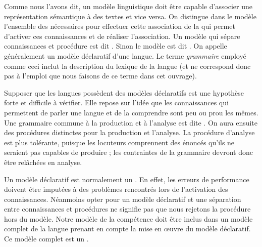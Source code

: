 Comme nous l’avons dit, un modèle linguistique doit être capable d’associer une représentation sémantique à des textes et vice versa. On distingue dans le modèle l’ensemble des  nécessaires pour effectuer cette association de la  qui permet d’activer ces connaissances et de réaliser l’association. Un modèle qui sépare connaissances et procédure est dit . Sinon le modèle est dit . On appelle généralement  un modèle déclaratif d’une langue. Le terme \textit{grammaire} employé comme ceci inclut la description du lexique de la langue (et ne correspond donc pas à l'emploi que nous faisons de ce terme dans cet ouvrage).

Supposer que les langues possèdent des modèles déclaratifs est une hypothèse forte et difficile à vérifier. Elle repose sur l’idée que les connaissances qui permettent de parler une langue et de la comprendre sont peu ou prou les mêmes. Une grammaire commune à la production et à l’analyse est dite . On aura ensuite des procédures distinctes pour la production et l’analyse. La procédure d’analyse est plus tolérante, puisque les locuteurs comprennent des énoncés qu’ils ne seraient pas capables de produire ; les contraintes de la grammaire devront donc être relâchées en analyse.

Un modèle déclaratif est normalement un . En effet, les erreurs de performance doivent être imputées à des problèmes rencontrés lors de l’activation des connaissances. Néanmoins opter pour un modèle déclaratif et une séparation entre connaissances et procédures ne signifie pas que nous rejetons la procédure hors du modèle. Notre modèle de la compétence doit être inclus dans un modèle complet de la langue prenant en compte la mise en œuvre du modèle déclaratif. Ce modèle complet est un .

